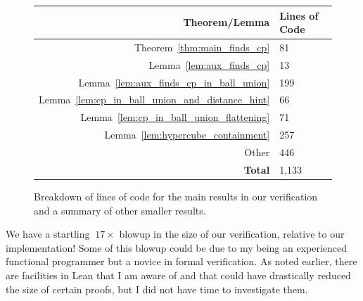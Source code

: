 \documentclass{article}
\begin{document}
\begin{figure}[H]
\begin{center}
\begin{tabular} {|| r | l ||}
  \hline
  Theorem/Lemma & Lines of Code \\
  \hline
  \hline
  Theorem~\ref{thm:main_finds_cp} & 81 \\
  \hline
  Lemma~\ref{lem:aux_finds_cp} & 13 \\
  \hline
  Lemma~\ref{lem:aux_finds_cp_in_ball_union} & 199 \\
  \hline
  Lemma~\ref{lem:cp_in_ball_union_and_distance_hint} & 66 \\
  \hline
  Lemma~\ref{lem:cp_in_ball_union_flattening} & 71 \\
  \hline
  Lemma~\ref{lem:hypercube_containment} & 257 \\
  \hline
  Other & 446 \\
  \hline
  \hline
  \textbf{Total} & 1,133 \\
  \hline
\end{tabular}
\end{center}
\caption{Breakdown of lines of code for the main results in our verification and a summary of other smaller results.}
\label{fig:proof_loc}
\end{figure}
We have a startling $~17\times$ blowup in the size of our verification, relative to our implementation!
Some of this blowup could be due to my being an experienced functional programmer but a novice in formal verification.
As noted earlier, there are facilities in Lean that I am aware of and that could have drastically reduced the size of certain proofs, but I did not have time to investigate them.


\end{document}
